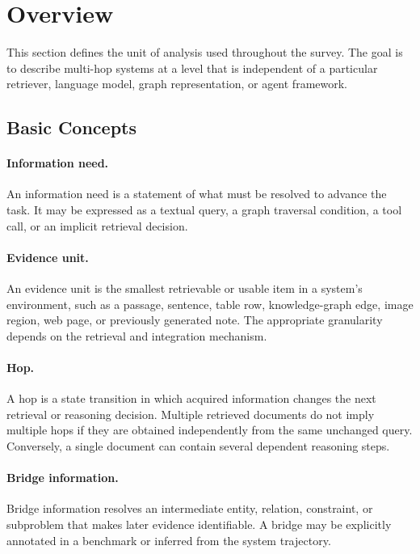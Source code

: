 \section{Overview}
\label{sec:overview}

This section defines the unit of analysis used throughout the survey. The goal is to describe multi-hop systems at a level that is independent of a particular retriever, language model, graph representation, or agent framework.

\subsection{Basic Concepts}
\label{subsec:basic_concepts}

\paragraph{Information need.}
An information need is a statement of what must be resolved to advance the task. It may be expressed as a textual query, a graph traversal condition, a tool call, or an implicit retrieval decision.

\paragraph{Evidence unit.}
An evidence unit is the smallest retrievable or usable item in a system's environment, such as a passage, sentence, table row, knowledge-graph edge, image region, web page, or previously generated note. The appropriate granularity depends on the retrieval and integration mechanism.

\paragraph{Hop.}
A hop is a state transition in which acquired information changes the next retrieval or reasoning decision. Multiple retrieved documents do not imply multiple hops if they are obtained independently from the same unchanged query. Conversely, a single document can contain several dependent reasoning steps.

\paragraph{Bridge information.}
Bridge information resolves an intermediate entity, relation, constraint, or subproblem that makes later evidence identifiable. A bridge may be explicitly annotated in a benchmark or inferred from the system trajectory.

